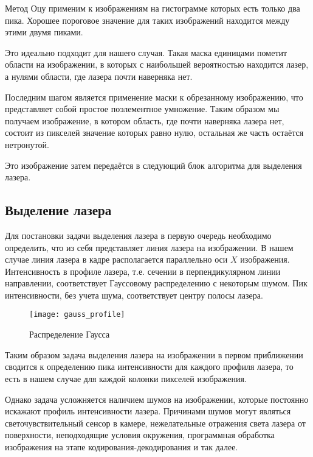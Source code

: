             Метод Оцу применим к изображениям на гистограмме которых есть только два пика. Хорошее пороговое значение для таких изображений находится между этими двумя пиками\cite{opencvTHRESH}.
            
            Это идеально подходит для нашего случая. Такая маска единицами пометит области на изображении, в которых с наибольшей вероятностью находится лазер, а нулями области, где лазера почти наверняка нет.
            
            Последним шагом является применение маски к обрезанному изображению, что представляет собой простое поэлементное умножение. Таким образом мы получаем изображение, в котором область, где почти наверняка лазера нет, состоит из пикселей значение которых равно нулю, остальная же часть остаётся нетронутой.

            Это изображение затем передаётся в следующий блок алгоритма для выделения лазера.

        \subsection{Выделение лазера}
            Для постановки задачи выделения лазера в первую очередь необходимо определить, что из себя представляет линия лазера на изображении. В нашем случае линия лазера в кадре располагается параллельно оси $ X $ изображения. Интенсивность в профиле лазера, т.е. сечении в перпендикулярном линии направлении, соответствует Гауссовому распределению\cite{Qi2013, Molder2014} с некоторым шумом. Пик интенсивности, без учета шума, соответствует центру полосы лазера.
            \begin{wrapfigure}{l}{0.4\linewidth}
                \centering
                \texttt{[image: gauss\_profile]}
                \caption{Распределение Гаусса}
                \label{pic:gauss_profile}
            \end{wrapfigure}
            Таким образом задача выделения лазера на изображении в первом приближении сводится к определению пика интенсивности для каждого профиля лазера, то есть в нашем случае для каждой колонки пикселей изображения.
            
            Однако задача усложняется наличием шумов на изображении, которые постоянно искажают профиль интенсивности лазера. Причинами шумов могут являться светочувствительный сенсор в камере, нежелательные отражения света лазера от поверхности, неподходящие условия окружения, программная обработка изображения на этапе кодирования-декодирования и так далее.
            
